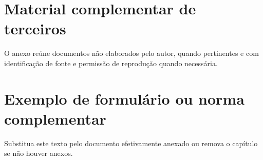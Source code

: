 \begin{anexosenv}\partanexos
\chapter{Material complementar de terceiros}
O anexo reúne documentos não elaborados pelo autor, quando pertinentes e com identificação de fonte e permissão de reprodução quando necessária.
\chapter{Exemplo de formulário ou norma complementar}
Substitua este texto pelo documento efetivamente anexado ou remova o capítulo se não houver anexos.
\end{anexosenv}
